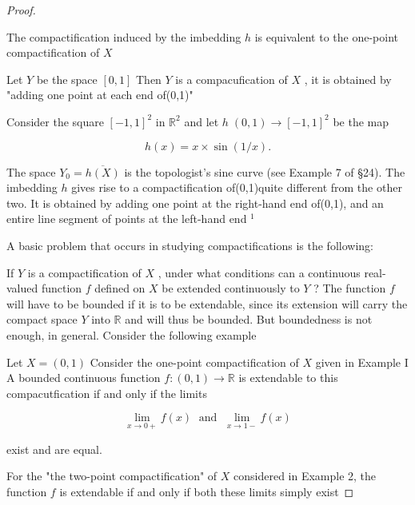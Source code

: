 \begin{proof}
\begin{example}
The compactification induced by the imbedding \(h\) is equivalent to the one-point compactification of \(X\)
\end{example}

\begin{example} Let \(Y\) be the space \(\left\lbrack  {0,1}\right\rbrack\) Then \(Y\) is a compacufication of \(X\) , it is obtained by "adding one point at each end of(0,1)"
\end{example}

\begin{example} Consider the square \({\left\lbrack  -1,1\right\rbrack  }^{2}\) in \({\mathbb{R}}^{2}\) and let \(h\;\left( {0,1}\right)  \rightarrow  {\left\lbrack  -1,1\right\rbrack  }^{2}\) be the map

\[
h\left( x\right)  = x \times  \sin \left( {1/x}\right) .
\]

The space \({Y}_{0} = \overline{h\left( X\right) }\) is the topologist’s sine curve (see Example 7 of §24). The imbedding \(h\) gives rise to a compactification of(0,1)quite different from the other two. It is obtained by adding one point at the right-hand end of(0,1), and an entire line segment of points at the left-hand end \({}^{1}\)
\end{example}

A basic problem that occurs in studying compactifications is the following:

If \(Y\) is a compactification of \(X\) , under what conditions can a continuous real-valued function \(f\) defined on \(X\) be extended continuously to \(Y\) ? The function \(f\) will have to be bounded if it is to be extendable, since its extension will carry the compact space \(Y\) into \(\mathbb{R}\) and will thus be bounded. But boundedness is not enough, in general. Consider the following example

\begin{example} Let \(X = \left( {0,1}\right)\) Consider the one-point compactification of \(X\) given in Example I A bounded continuous function \(f : \left( {0,1}\right)  \rightarrow  \mathbb{R}\) is extendable to this compacutfication if and only if the limits

\[
\mathop{\lim }\limits_{{x \rightarrow  0 + }}f\left( x\right) \;\text{ and }\;\mathop{\lim }\limits_{{x \rightarrow  1 - }}f\left( x\right)
\]

exist and are equal.
\end{example}

For the "the two-point compactification" of \(X\) considered in Example 2, the function \(f\) is extendable if and only if both these limits simply exist


\end{proof}
